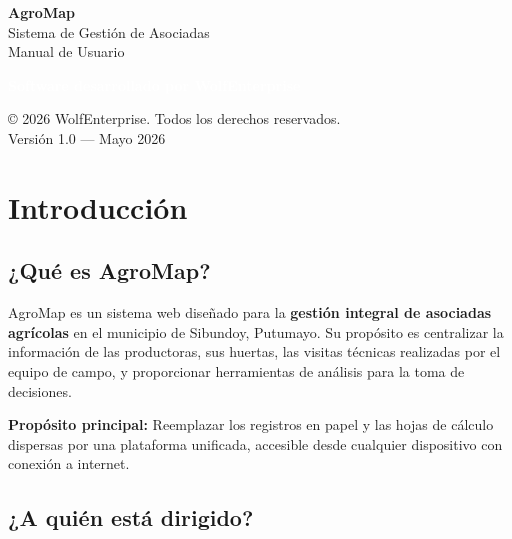 \documentclass[12pt]{article}
\begin{document}
\begin{titlepage}
  \centering
  \vspace*{4cm}
  {\Huge\bfseries\color{primary} AgroMap \\[0.5em]}
  {\LARGE\color{gray} Sistema de Gestión de Asociadas \\[1.5em]}
  {\large\color{gray} Manual de Usuario \\[0.5em]}
  \vspace{2cm}
  \begin{tcolorbox}[colback=primary!90, colframe=primary, arc=10pt, width=0.7\textwidth, center]
    \centering\textcolor{white}{\large\textbf{Software desarrollado por WolfEnterprise}}
  \end{tcolorbox}
  \vspace{1.5cm}
  {\large © 2026 WolfEnterprise. Todos los derechos reservados.\\[0.3em]}
  {\large Versión 1.0 --- Mayo 2026}
  \vfill
\end{titlepage}

\newpage
\tableofcontents
\newpage

\section{Introducción}
\label{sec:introduccion}

\subsection{¿Qué es AgroMap?}
\label{subsec:que-es}

AgroMap es un sistema web diseñado para la \textbf{gestión integral de asociadas agrícolas} en el municipio de Sibundoy, Putumayo. Su propósito es centralizar la información de las productoras, sus huertas, las visitas técnicas realizadas por el equipo de campo, y proporcionar herramientas de análisis para la toma de decisiones.

\begin{infobox}
  \textbf{Propósito principal:} Reemplazar los registros en papel y las hojas de cálculo dispersas por una plataforma unificada, accesible desde cualquier dispositivo con conexión a internet.
\end{infobox}

\subsection{¿A quién está dirigido?}
\end{document}
